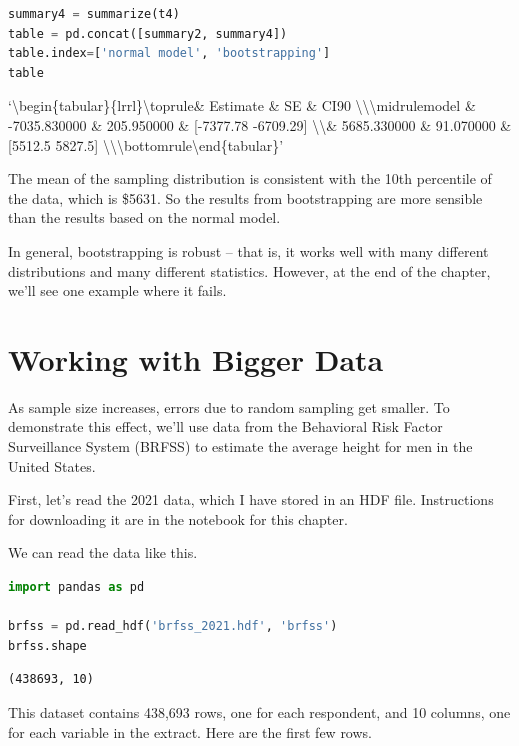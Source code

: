 \begin{lstlisting}[language=Python,style=source]
summary4 = summarize(t4)
table = pd.concat([summary2, summary4])
table.index=['normal model', 'bootstrapping']
table
\end{lstlisting}

`\textbackslash begin\{tabular\}\{lrrl\}\n\textbackslash toprule\n \&
Estimate \& SE \& CI90
\textbackslash\textbackslash{}\n\textbackslash midrule\nnormal model \&
-7035.830000 \& 205.950000 \& {[}-7377.78 -6709.29{]}
\textbackslash\textbackslash{}\nbootstrapping \& 5685.330000 \&
91.070000 \& {[}5512.5 5827.5{]}
\textbackslash\textbackslash{}\n\textbackslash bottomrule\n\textbackslash end\{tabular\}\n'

The mean of the sampling distribution is consistent with the 10th
percentile of the data, which is \$5631. So the results from
bootstrapping are more sensible than the results based on the normal
model.

In general, bootstrapping is robust -- that is, it works well with many
different distributions and many different statistics. However, at the
end of the chapter, we'll see one example where it fails.

\hypertarget{working-with-bigger-data}{%
\section{Working with Bigger Data}\label{working-with-bigger-data}}

As sample size increases, errors due to random sampling get smaller. To
demonstrate this effect, we'll use data from the Behavioral Risk Factor
Surveillance System (BRFSS) to estimate the average height for men in
the United States.

First, let's read the 2021 data, which I have stored in an HDF file.
Instructions for downloading it are in the notebook for this chapter.

We can read the data like this.

\begin{lstlisting}[language=Python,style=source]
import pandas as pd

brfss = pd.read_hdf('brfss_2021.hdf', 'brfss')
brfss.shape
\end{lstlisting}

\begin{lstlisting}[style=output]
(438693, 10)
\end{lstlisting}

This dataset contains 438,693 rows, one for each respondent, and 10
columns, one for each variable in the extract. Here are the first few
rows.

